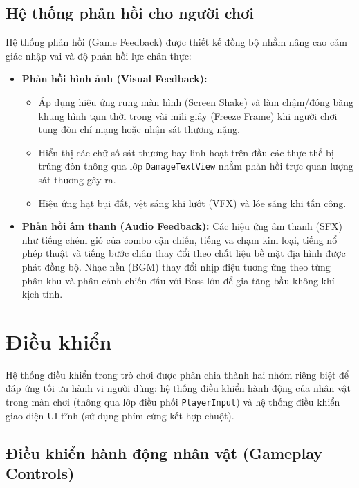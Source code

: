\documentclass[../DoAn.tex]{subfiles}
\begin{document}
\subsection{Hệ thống phản hồi cho người chơi}
\label{subsection:3.3.6}

Hệ thống phản hồi (Game Feedback) được thiết kế đồng bộ nhằm nâng cao cảm giác nhập vai và độ phản hồi lực chân thực:
\begin{itemize}
    \item \textbf{Phản hồi hình ảnh (Visual Feedback):} 
    \begin{itemize}
        \item Áp dụng hiệu ứng rung màn hình (Screen Shake) và làm chậm/đóng băng khung hình tạm thời trong vài mili giây (Freeze Frame) khi người chơi tung đòn chí mạng hoặc nhận sát thương nặng.
        \item Hiển thị các chữ số sát thương bay linh hoạt trên đầu các thực thể bị trúng đòn thông qua lớp \texttt{DamageTextView} nhằm phản hồi trực quan lượng sát thương gây ra.
        \item Hiệu ứng hạt bụi đất, vệt sáng khi lướt (VFX) và lóe sáng khi tấn công.
    \end{itemize}
    \item \textbf{Phản hồi âm thanh (Audio Feedback):} Các hiệu ứng âm thanh (SFX) như tiếng chém gió của combo cận chiến, tiếng va chạm kim loại, tiếng nổ phép thuật và tiếng bước chân thay đổi theo chất liệu bề mặt địa hình được phát đồng bộ. Nhạc nền (BGM) thay đổi nhịp điệu tương ứng theo từng phân khu và phân cảnh chiến đấu với Boss lớn để gia tăng bầu không khí kịch tính.
\end{itemize}

\section{Điều khiển}
\label{section:3.4}

Hệ thống điều khiển trong trò chơi được phân chia thành hai nhóm riêng biệt để đáp ứng tối ưu hành vi người dùng: hệ thống điều khiển hành động của nhân vật trong màn chơi (thông qua lớp điều phối \texttt{PlayerInput}) và hệ thống điều khiển giao diện UI tĩnh (sử dụng phím cứng kết hợp chuột).

\subsection{Điều khiển hành động nhân vật (Gameplay Controls)}
\label{subsection:3.4.1}
\end{document}
